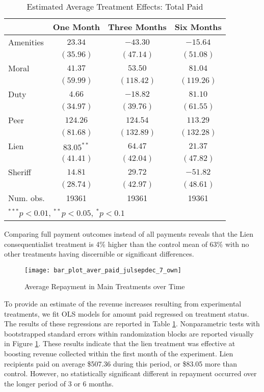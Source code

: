 \documentclass[12pt,titlepage]{article}
\begin{document}
\begin{table}[htbp]
\caption{Estimated Average Treatment Effects: Total Paid}
\begin{center}
\begin{tabular}{l c c c }
\hline
          & One Month & Three Months & Six Months \\
\hline
Amenities & $23.34$      & $-43.30$   & $-15.64$   \\
          & $(35.96)$    & $(47.14)$  & $(51.08)$  \\
Moral     & $41.37$      & $53.50$    & $81.04$    \\
          & $(59.99)$    & $(118.42)$ & $(119.26)$ \\
Duty      & $4.66$       & $-18.82$   & $81.10$    \\
          & $(34.97)$    & $(39.76)$  & $(61.55)$  \\
Peer      & $124.26$     & $124.54$   & $113.29$   \\
          & $(81.68)$    & $(132.89)$ & $(132.28)$ \\
Lien      & $83.05^{**}$ & $64.47$    & $21.37$    \\
          & $(41.41)$    & $(42.04)$  & $(47.82)$  \\
Sheriff   & $14.81$      & $29.72$    & $-51.82$   \\
          & $(28.74)$    & $(42.97)$  & $(48.61)$  \\
\hline
Num. obs. & 19361        & 19361      & 19361      \\
\hline
\multicolumn{4}{l}{\scriptsize{$^{***}p<0.01$, $^{**}p<0.05$, $^*p<0.1$}}
\end{tabular}
\label{tbl:reg7_tp}
\end{center}
\end{table}

Comparing full payment 
outcomes instead of all payments reveals that the Lien consequentialist 
treatment is 4\% higher than the control mean of 63\% with no other 
treatments having discernible or significant differences.

\begin{figure}[htpb]
\begin{center}
\caption{Average Repayment in Main Treatments over Time}
\label{fig:tp_time_7_own}
\bigskip
\texttt{[image: bar\_plot\_aver\_paid\_julsepdec\_7\_own]}
\end{center}
\end{figure}


To provide an estimate of the revenue increases resulting from experimental 
treatments, we fit OLS models for amount paid regressed on treatment status.
The results of these regressions are reported in 
Table \ref{tbl:reg7_tp}. Nonparametric tests with bootstrapped standard errors within 
randomization blocks are reported visually in Figure \ref{fig:tp_time_7_own}. 
These results indicate that the lien treatment was effective at boosting 
revenue collected within the first month of the experiment. Lien recipients 
paid on average \$507.36 during this period, or \$83.05 more than control. However, no statistically 
significant different in repayment occurred over the longer period of 3 or 6 months.
\end{document}
